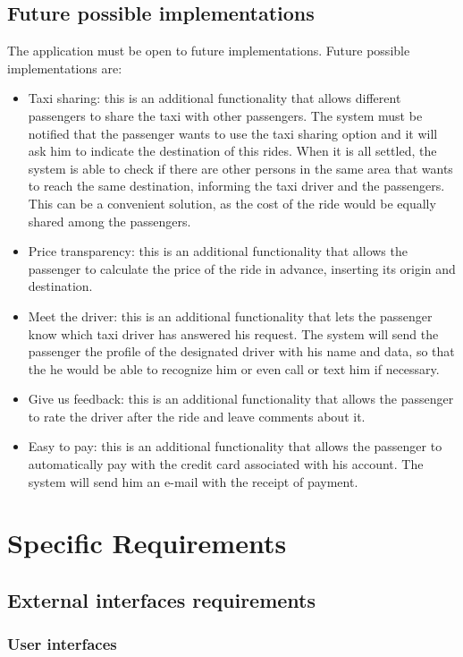\documentclass[18pt,oneside,a4paper, titlepage]{article}
\begin{document}
		\subsection{Future possible implementations}
			The application must be open to future implementations. 
			Future possible implementations are:
			\begin{itemize}
				\item Taxi sharing: this is an additional functionality that allows different passengers to share the taxi with other passengers. The system must be notified that the passenger wants to use the taxi sharing option and it will ask him to indicate the destination of this rides. When it is all settled, the system is able to check if there are other persons in the same area that wants to reach the same destination, informing the taxi driver and the passengers. This can be a convenient solution, as the cost of the ride would be equally shared among the passengers.
				\item Price transparency: this is an additional functionality that allows the passenger to calculate the price of the ride in advance, inserting its origin and destination.
				\item Meet the driver: this is an additional functionality that lets the passenger know which taxi driver has answered his request. The system will send the passenger the profile of the designated driver with his name and data, so that the he would be able to recognize him or even call or text him if necessary.
				\item Give us feedback: this is an additional functionality that allows the passenger to rate the driver after the ride and leave comments about it.
				\item Easy to pay: this is an additional functionality that allows the passenger to automatically pay with the credit card associated with his account. The system will send him an e-mail with the receipt of payment.
			\end{itemize}

\newpage
\section{Specific Requirements}
	\subsection{External interfaces requirements}
		\subsubsection{User interfaces}
\end{document}
